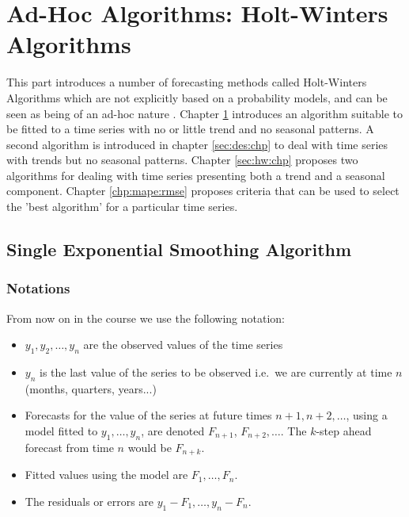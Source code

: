 \documentclass[a4paper,11pt,oneside,onecolumn]{book}
\begin{document}
\part{Ad-Hoc Algorithms: Holt-Winters Algorithms } \label{part:Holt:Winters}

This part introduces a number of forecasting methods called Holt-Winters Algorithms which are not explicitly based on a probability models, and can be seen as being of an ad-hoc nature \cite{Chatfield2001}.
Chapter \ref{sec:SES:chp} introduces an algorithm suitable to be fitted to a time series with no or little trend and no seasonal patterns.  
A second algorithm  is introduced  in chapter \ref{sec:des:chp} to deal with time series with trends but no seasonal patterns.
Chapter \ref{sec:hw:chp} proposes two algorithms for dealing with time series  presenting both a trend and a seasonal component.
Chapter \ref{chp:mape:rmse} proposes criteria that can be used to select the 'best algorithm' for a particular time series.
 



\chapter{Single Exponential Smoothing Algorithm}
\label{sec:SES:chp}



\section{Notations}

From now on in the course we use the following notation:
\begin{itemize}
\item $y_1, y_2, \ldots,y_n$ are the observed values of the time
series
\item $y_n$ is the last value of the series to be observed i.e.\
we are currently at time $n$ (months, quarters, years...)
\item Forecasts for the value of the series at future times $n+1,n+2,\ldots$, using a model fitted to $y_1,\ldots,y_n$, are denoted $F_{n+1}$, $F_{n+2},\ldots$. The
$k$-step ahead forecast from time $n$ would be $F_{n+k}$.
\item Fitted values using the model are $F_1,\ldots,F_n$.
\item The residuals or errors are $y_1 - F_1,\ldots,y_n - F_n$.
\end{itemize}
\end{document}
